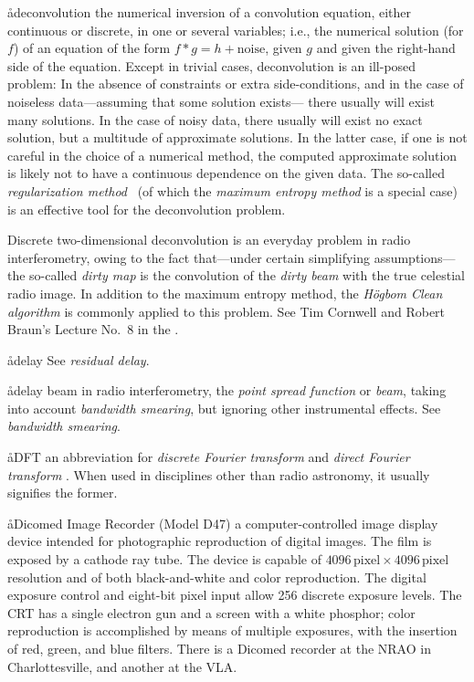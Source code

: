 \aa{deconvolution}
the numerical inversion of a convolution equation, either continuous
or discrete, in one or several variables;
i.e., the numerical solution (for $f$) of an equation of the form
$f\ast g=h+\text{noise}$, given $g$ and given the right-hand side
of the equation.
Except in trivial cases, deconvolution is an ill-posed problem:
In the absence of constraints or extra side-conditions,
and in the case of noiseless data---assuming that some solution exists---%
there usually will exist many solutions.
In the case of noisy data, there usually will exist no exact solution,
but a multitude of approximate solutions.
In the latter case, if one is not careful in the choice of a numerical method,
the computed approximate solution is likely not to have
a continuous dependence on the given data.
The so-called {\it regularization method} \qv\ (of which the {\it maximum
entropy method} is a special case) is an effective tool for the
deconvolution problem.
\par
Discrete two-dimensional deconvolution is an everyday problem in
radio interferometry, owing to the fact that---under certain simplifying
assumptions---the so-called {\it dirty map} is the convolution of
the {\it dirty beam} with the true celestial radio image.
In addition to the maximum entropy method,
the {\it H\"ogbom Clean algorithm} is commonly applied to this problem.
See Tim Cornwell and Robert Braun's Lecture No.~8 in the \sira.

\aa{delay}
See {\it residual delay}.

\aa{delay beam}
in radio interferometry, the {\it point spread function} or {\it beam},
taking into account {\it bandwidth smearing}, but ignoring other
instrumental effects.
See {\it bandwidth smearing}.

\aa{DFT}
an abbreviation for {\it discrete Fourier transform}
and {\it direct Fourier transform} \qv.
When used in disciplines other than radio astronomy,
it usually signifies the former.

\aa{Dicomed Image Recorder (Model D47)}
a computer-controlled image display device intended for
photographic reproduction of digital images.
The film is exposed by a cathode ray tube.
The device is capable of $4096\,\text{pixel}\times4096\,\text{pixel}$
resolution and of both black-and-white and color reproduction.
The digital exposure control and eight-bit pixel input
allow 256 discrete exposure levels.
The CRT has a single electron gun and a screen with a
white phosphor; color reproduction is accomplished by means of multiple
exposures, with the insertion of red, green, and blue filters.
There is a Dicomed recorder at the NRAO in Charlottesville,
and another at the VLA.


